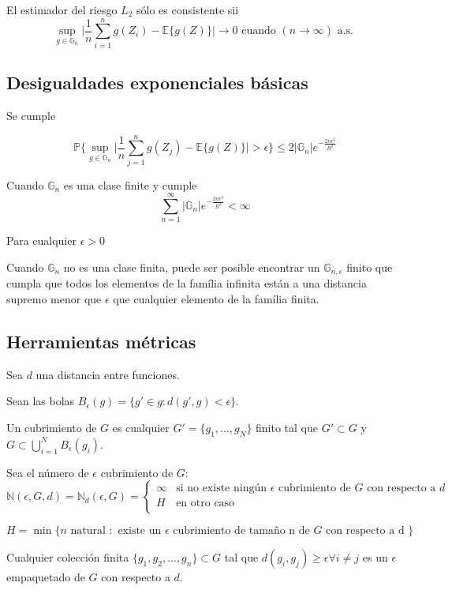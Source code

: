 \documentclass[12pt, a4paper]{article}
\begin{document}
El estimador del riesgo $L_2$ sólo es consistente sii $$ \mathop{sup}_{g\in\mathds{G}_n} \Bigg | \frac{1}{n} \sum_{i=1}^n g(Z_i) - \mathds{E}\{g(Z)\} \Bigg | \rightarrow 0 \text{ cuando } (n\rightarrow \infty) \text{ a.s. }$$

\subsection{Desigualdades exponenciales básicas}
Se cumple 

$$ \mathds{P} \Bigg \{ \mathop{sup}_{g \in \mathds{G}_n} \Bigg | \frac{1}{n} \sum_{j=1}^{n} g(Z_j)-\mathds{E}\{ g(Z) \} \Bigg | > \epsilon \Bigg \} \leq 2 | \mathds{G}_n| e^{-\frac{2n\epsilon^2}{B^2}} $$

Cuando $\mathds{G}_n$ es una clase finite y cumple
$$ \sum_{n=1}^{\infty} |\mathds{G}_n| e^{- \frac{2n\epsilon^2}{B^2}} < \infty$$

Para cualquier $\epsilon>0$

Cuando $\mathds{G}_n$ no es una clase finita, puede ser posible encontrar un $\mathds{G}_{n,\epsilon}$ finito que cumpla que todos los elementos de la família infinita están a una distancia supremo menor que $\epsilon$ que cualquier elemento de la família finita.

\subsection{Herramientas métricas}

Sea $d$ una distancia entre funciones.

Sean las bolas $B_{\epsilon}(g)=\{ g' \in g:d(g',g)<\epsilon \}$.

Un cubrimiento de $G$ es cualquier $G'=\{ g_1,..., g_N \}$ finito tal que $G' \subset G $ y $G \subset \bigcup_{i=1}^N B_{\epsilon}(g_i)$.


Sea el número de $\epsilon$ cubrimiento de $G$:
$$\mathds{N}(\epsilon,G,d)=\mathds{N}_d(\epsilon,G)=
\begin{cases}
 \infty & \text{si no existe ningún $\epsilon$ cubrimiento de $G$ con respecto a $d$} \\

 H & \text{en otro caso}\\
\end{cases}$$

$$H=\mathop{min}\{ n \text{ natural } : \text{ existe un $\epsilon$ cubrimiento de tamaño n de $G$ con respecto a d } \}$$

Cualquier colección finita $\{ g_1, g_2, ..., g_n\} \subset G$ tal que $d(g_i,g_j)\geq\epsilon\forall i\neq j$ es un $\epsilon$ empaquetado de $G$ con respecto a $d$.
\end{document}
